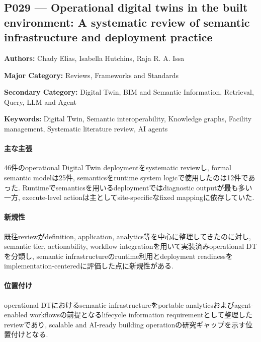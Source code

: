 \subsection{P029 --- Operational digital twins in the built environment: A systematic review of semantic infrastructure and deployment practice}
\label{paper:P029}
\textbf{Authors:} Chady Elias, Isabella Hutchins, Raja R. A. Issa\par
\textbf{Major Category:} Reviews, Frameworks and Standards\par
\textbf{Secondary Category:} Digital Twin, BIM and Semantic Information, Retrieval, Query, LLM and Agent\par
\textbf{Keywords:} Digital Twin, Semantic interoperability, Knowledge graphs, Facility management, Systematic literature review, AI agents\par
\paragraph{主な主張}
46件のoperational Digital Twin deploymentをsystematic reviewし, formal semantic modelは25件, semanticsをruntime system logicで使用したのは12件であった. Runtimeでsemanticsを用いるdeploymentではdiagnostic outputが最も多い一方, execute-level actionは主としてsite-specificなfixed mappingに依存していた. \cite{Elias:2026OperationalDTReview}
\paragraph{新規性}
既往reviewがdefinition, application, analytics等を中心に整理してきたのに対し, semantic tier, actionability, workflow integrationを用いて実装済みoperational DTを分類し, semantic infrastructureのruntime利用とdeployment readinessをimplementation-centeredに評価した点に新規性がある.
\paragraph{位置付け}
operational DTにおけるsemantic infrastructureをportable analyticsおよびagent-enabled workflowsの前提となるlifecycle information requirementとして整理したreviewであり, scalable and AI-ready building operationの研究ギャップを示す位置付けとなる.
